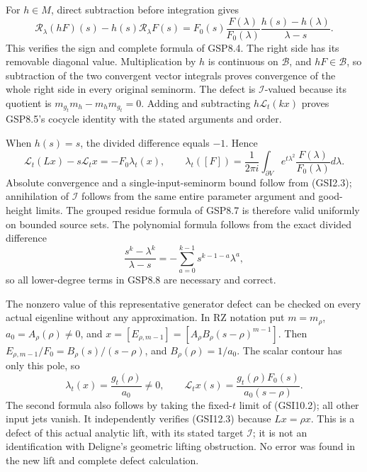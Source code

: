 For \(h\in M\), direct subtraction before integration gives \[
\mathscr R_\lambda(hF)(s)-h(s)\mathscr R_\lambda F(s)
=F_0(s)\frac{F(\lambda)}{F_0(\lambda)}
\frac{h(s)-h(\lambda)}{\lambda-s}.
\tag{GSI12.2}
\] This verifies the sign and complete formula of GSP8.4. The right side
has its removable diagonal value. Multiplication by \(h\) is continuous
on \(\mathcal B\), and \(hF\in\mathcal B\), so subtraction of the two
convergent vector integrals proves convergence of the whole right side
in every original seminorm. The defect is \(\mathcal I\)-valued because
its quotient is \(m_{g_t}m_h-m_hm_{g_t}=0\). Adding and subtracting
\(h\mathcal L_t(kx)\) proves GSP8.5's cocycle identity with the stated
arguments and order.

When \(h(s)=s\), the divided difference equals \(-1\). Hence \[
\mathcal L_t(Lx)-s\mathcal L_tx=-F_0\lambda_t(x),
\qquad
\lambda_t([F])=\frac1{2\pi i}\int_{\partial V}
e^{t\lambda^2}\frac{F(\lambda)}{F_0(\lambda)}d\lambda.
\tag{GSI12.3}
\] Absolute convergence and a single-input-seminorm bound follow from
(GSI2.3); annihilation of \(\mathcal I\) follows from the same entire
parameter argument and good-height limits. The grouped residue formula
of GSP8.7 is therefore valid uniformly on bounded source sets. The
polynomial formula follows from the exact divided difference \[
\frac{s^k-\lambda^k}{\lambda-s}
=-\sum_{a=0}^{k-1}s^{k-1-a}\lambda^a,
\tag{GSI12.4}
\] so all lower-degree terms in GSP8.8 are necessary and correct.

The nonzero value of this representative generator defect can be checked
on every actual eigenline without any approximation. In RZ notation put
\(m=m_\rho\), \(a_0=A_\rho(\rho)\ne0\), and
\(x=[E_{\rho,m-1}]=[A_\rho B_\rho(s-\rho)^{m-1}]\). Then
\(E_{\rho,m-1}/F_0=B_\rho(s)/(s-\rho)\), and \(B_\rho(\rho)=1/a_0\). The
scalar contour has only this pole, so \[
\lambda_t(x)=\frac{g_t(\rho)}{a_0}\ne0,
\qquad
\mathcal L_tx(s)=\frac{g_t(\rho)F_0(s)}{a_0(s-\rho)}.
\tag{GSI12.5}
\] The second formula also follows by taking the fixed-\(t\) limit of
(GSI10.2); all other input jets vanish. It independently verifies
(GSI12.3) because \(Lx=\rho x\). This is a defect of this actual
analytic lift, with its stated target \(\mathcal I\); it is not an
identification with Deligne's geometric lifting obstruction. No error
was found in the new lift and complete defect calculation.
